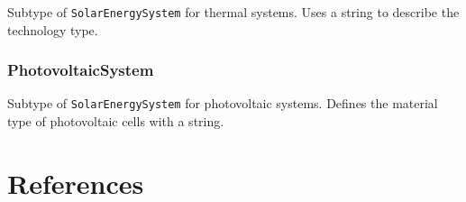 \documentclass[a4paper,12pt]{article}
\let\stdsection\section%
\renewcommand\section{\newpage\stdsection}
\begin{document}
Subtype of \lstinline!SolarEnergySystem! for thermal systems. Uses a
string to describe the technology type.

\subsubsection{PhotovoltaicSystem}\label{photovoltaicsystem}

Subtype of \lstinline!SolarEnergySystem! for photovoltaic systems.
Defines the material type of photovoltaic cells with a string.

\section*{References}\label{references}

\hypertarget{refs}{}
\end{document}
